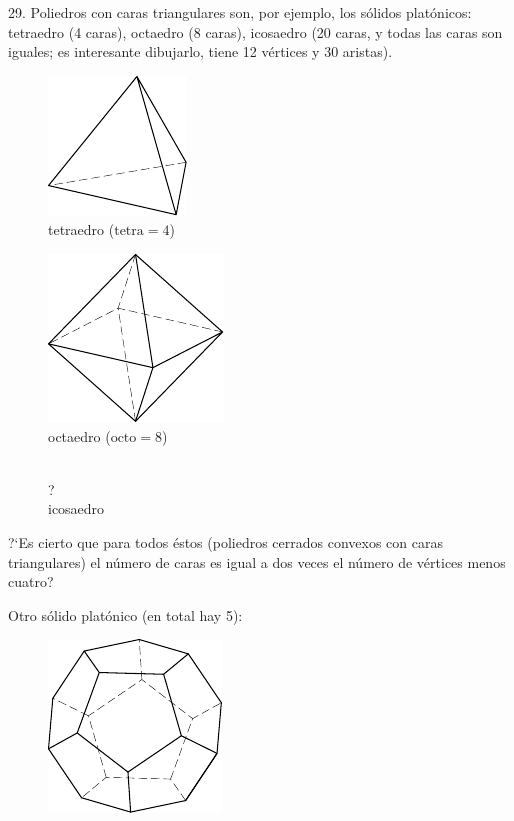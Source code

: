 \begin{problem}{29.}
	Poliedros con caras triangulares son, por ejemplo, los s\'olidos plat\'onicos: tetraedro (4 caras), octaedro (8 caras), icosaedro (20 caras, y todas las caras son iguales; es interesante dibujarlo, tiene 12 v\'ertices y 30 aristas).
	\begin{figure}
		\footnotesize
		\null\hfill
		\parbox{0.3\linewidth}{\centering\includegraphics{taskbook-131}\\tetraedro ($\text{tetra}= 4$)}
		\hfill
		\parbox{0.3\linewidth}{\centering\includegraphics{taskbook-132}\\octaedro ($\text{octo}= 8$)}
		\hfill\null\\
		{\Huge ?}\\icosaedro
	\end{figure}
	?`Es cierto que para todos \'estos (poliedros cerrados convexos con caras triangulares) el n\'umero de caras es igual a dos veces el n\'umero de v\'ertices menos cuatro?

	Otro s\'olido plat\'onico (en total hay 5):
	\begin{figure}
		\includegraphics{taskbook-14}
	\end{figure}
\end{problem}

